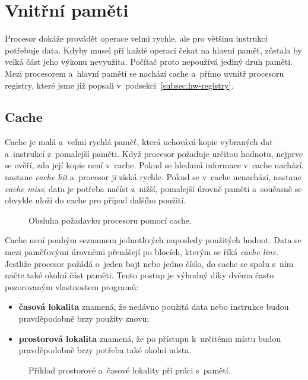 \section{Vnitřní paměti}\label{sec:hw-vnitrni-pameti}

Procesor dokáže provádět operace velmi rychle, ale pro většinu instrukcí potřebuje data. Kdyby musel při každé operaci čekat na hlavní paměť, zůstala by velká část jeho výkonu nevyužita. Počítač proto nepoužívá jediný druh paměti. Mezi procesorem a~hlavní pamětí se nachází cache a~přímo uvnitř procesoru registry, které jsme již popsali v~podsekci~\ref{subsec:hw-registry}.

\subsection{Cache}\label{subsec:hw-cache}

Cache je malá a~velmi rychlá paměť, která uchovává kopie vybraných dat a~instrukcí z~pomalejší paměti. Když procesor požaduje určitou hodnotu, nejprve se ověří, zda její kopie není v~cache. Pokud se hledaná informace v~cache nachází, nastane \emph{cache hit} a~procesor ji získá rychle. Pokud se v~cache nenachází, nastane \emph{cache miss}; data je potřeba načíst z~nižší, pomalejší úrovně paměti a~současně se obvykle uloží do cache pro případ dalšího použití.

\begin{figure}[ht]
    \centering
    
    \caption{Obsluha požadavku procesoru pomocí cache.}
    \label{fig:hw-cache}
\end{figure}

Cache není pouhým seznamem jednotlivých naposledy použitých hodnot. Data se mezi paměťovými úrovněmi přenášejí po blocích, kterým se říká \emph{cache line}. Jestliže procesor požádá o~jeden bajt nebo jedno číslo, do cache se spolu s~ním načte také okolní část paměti. Tento postup je výhodný díky dvěma často pozorovaným vlastnostem programů:
\begin{itemize}
    \item \textbf{časová lokalita} znamená, že nedávno použitá data nebo instrukce budou pravděpodobně brzy použity znovu;
    \item \textbf{prostorová lokalita} znamená, že po přístupu k~určitému místu budou pravděpodobně brzy potřeba také okolní místa.
\end{itemize}

\begin{figure}[ht]
    \centering
    
    \caption{Příklad prostorové a~časové lokality při práci s~pamětí.}
    \label{fig:hw-lokalita}
\end{figure}

